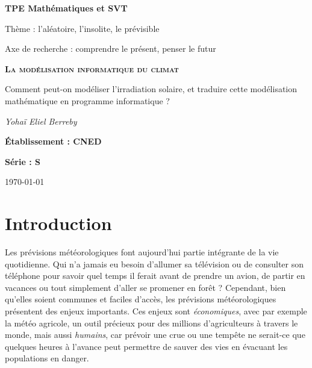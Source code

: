 \documentclass[12pt]{article}
\begin{document}

\begin{titlepage}
	\centering
	
	{\huge\bfseries  TPE Mathématiques et SVT\par}
	\vspace{0.2cm}	
	{ \Large Thème : l'aléatoire, l'insolite, le prévisible\par }
	{ \large Axe de recherche : comprendre le présent, penser le futur\par }
	\vspace{1.5cm}

	{\bfseries \scshape\Large La modélisation informatique du climat \par}
	\vspace{1cm}
	{\Large Comment peut-on modéliser l'irradiation solaire, et traduire cette modélisation mathématique en programme informatique ?\par}

	\vspace{1cm}
	{\Large\itshape Yohaï Eliel Berreby\par}
	
	\vfill
	
	
	{\Large\bfseries Établissement : CNED\par}
	\vspace{0.2cm}
	{\Large \bfseries Série : S }

	\vfill

	{\large \today\par}
\end{titlepage}


\clearpage
\tableofcontents{}
\clearpage


\section{Introduction} 

Les prévisions météorologiques font aujourd'hui partie intégrante de la vie quotidienne.
Qui n'a jamais eu besoin d'allumer sa télévision ou de consulter son téléphone pour savoir quel temps il ferait avant de prendre un avion, de partir en vacances ou tout simplement d'aller se promener en forêt ?
Cependant, bien qu'elles soient communes et faciles d'accès, les prévisions météorologiques présentent des enjeux importants.
Ces enjeux sont \emph{économiques}, avec par exemple la météo agricole, un outil précieux pour des millions d'agriculteurs à travers le monde, mais aussi \emph{humains}, car prévoir une crue ou une tempête ne serait-ce que quelques heures à l'avance peut permettre de sauver des vies en évacuant les populations en danger.
\end{document}
